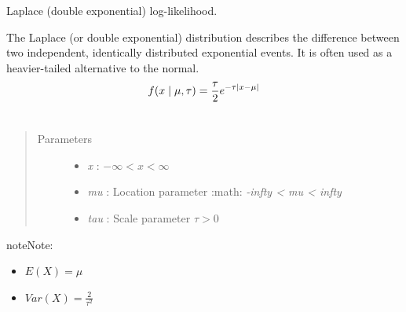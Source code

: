 \documentclass[letterpaper,10pt,english]{sphinxmanual}
\begin{document}
\begin{fulllineitems}
\label{distributions:pymc.distributions.laplace_like}
Laplace (double exponential) log-likelihood.

The Laplace (or double exponential) distribution describes the
difference between two independent, identically distributed exponential
events. It is often used as a heavier-tailed alternative to the normal.
\begin{gather}
\begin{split}f(x \mid \mu, \tau) = \frac{\tau}{2}e^{-\tau |x-\mu|}\end{split}\notag\\\begin{split}\end{split}\notag
\end{gather}\begin{quote}\begin{description}
\item[{Parameters }] \leavevmode\begin{itemize}
\item {} 
\emph{x} : $-\infty < x < \infty$

\item {} 
\emph{mu} : Location parameter :math: \emph{-infty \textless{} mu \textless{} infty}

\item {} 
\emph{tau} : Scale parameter $\tau > 0$

\end{itemize}

\end{description}\end{quote}

\begin{notice}{note}{Note:}\begin{itemize}
\item {} 
$E(X) = \mu$

\item {} 
$Var(X) = \frac{2}{\tau^2}$

\end{itemize}
\end{notice}

\end{fulllineitems}

\end{document}
